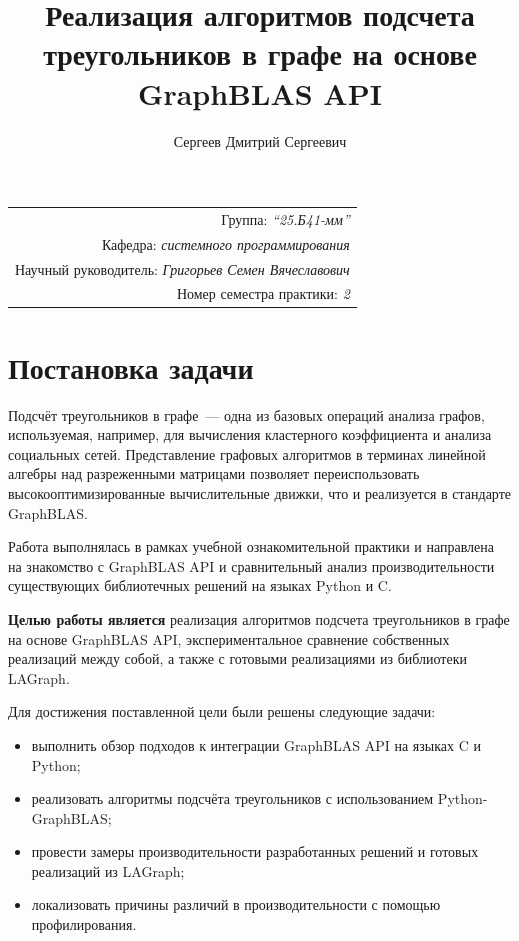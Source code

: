\documentclass[a4paper]{article}
\title{Реализация алгоритмов подсчета треугольников в графе на основе GraphBLAS API}
\author{Сергеев Дмитрий Сергеевич}
\date{}
\begin{document}
\maketitle
\begin{flushright}
\begin{tabular}{r}
    Группа: \emph{\enquote{25.Б41-мм}} \\
    Кафедра: \emph{системного программирования} \\
    Научный руководитель: \emph{Григорьев Семен Вячеславович} \\
    Номер семестра практики: \emph{2} \\
\end{tabular}
\end{flushright}

\section{Постановка задачи}

Подсчёт треугольников в графе~--- одна из базовых операций анализа графов, используемая, например, для вычисления кластерного коэффициента и анализа социальных сетей.
Представление графовых алгоритмов в терминах линейной алгебры над разреженными матрицами позволяет переиспользовать высокооптимизированные вычислительные движки, что и реализуется в стандарте GraphBLAS.

Работа выполнялась в рамках учебной ознакомительной практики и направлена на знакомство с GraphBLAS API и сравнительный анализ производительности существующих библиотечных решений на языках Python и C.

\textbf{Целью работы является} реализация алгоритмов подсчета треугольников в графе на основе GraphBLAS API, экспериментальное сравнение собственных реализаций между собой, а также с готовыми реализациями из библиотеки LAGraph.

Для достижения поставленной цели были решены следующие задачи:
\begin{itemize}
    \item выполнить обзор подходов к интеграции GraphBLAS API на языках C и Python;
    \item реализовать алгоритмы подсчёта треугольников с использованием Python-GraphBLAS;
    \item провести замеры производительности разработанных решений и готовых реализаций из LAGraph;
    \item локализовать причины различий в производительности с помощью профилирования.
\end{itemize}
\end{document}
